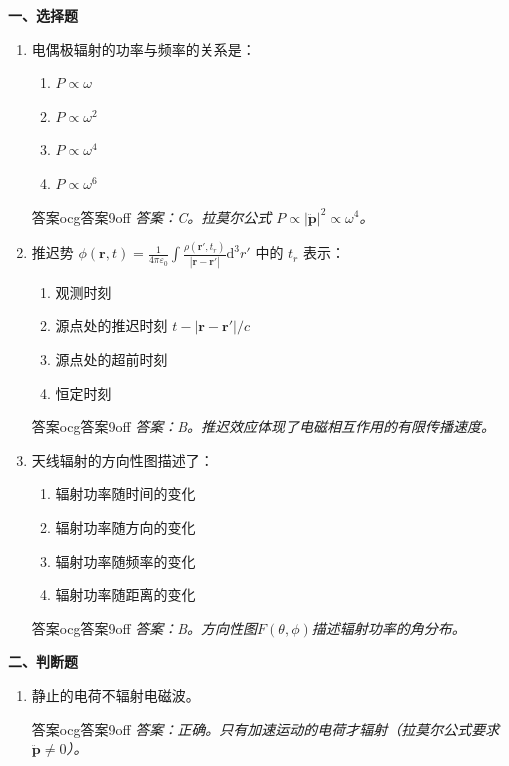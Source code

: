 \documentclass[11pt,a4paper,openany,oneside]{book}
\newcommand{\diff}{\mathrm{d}}
\newcommand{\eps}{\varepsilon}
\newcommand{\vect}[1]{\bm{#1}}
\begin{document}
\begin{miniquiz}
\textbf{一、选择题}
\begin{enumerate}[label=\arabic*.]
\item 电偶极辐射的功率与频率的关系是：
  \begin{enumerate}[label=(\Alph*),nosep]
  \item $P \propto \omega$
  \item $P \propto \omega^2$
  \item $P \propto \omega^4$
  \item $P \propto \omega^6$
  \end{enumerate}
\begin{ocg}{答案}{ocg答案9}{off}
  \textit{答案：C。拉莫尔公式 $P \propto |\ddot{\vect{p}}|^2 \propto \omega^4$。}
\end{ocg}

\item 推迟势 $\phi(\vect{r},t) = \frac{1}{4\pi\eps_0}\int \frac{\rho(\vect{r}',t_r)}{|\vect{r}-\vect{r}'|}\diff^3r'$ 中的 $t_r$ 表示：
  \begin{enumerate}[label=(\Alph*),nosep]
  \item 观测时刻
  \item 源点处的推迟时刻 $t - |\vect{r}-\vect{r}'|/c$
  \item 源点处的超前时刻
  \item 恒定时刻
  \end{enumerate}
\begin{ocg}{答案}{ocg答案9}{off}
  \textit{答案：B。推迟效应体现了电磁相互作用的有限传播速度。}
\end{ocg}

\item 天线辐射的方向性图描述了：
  \begin{enumerate}[label=(\Alph*),nosep]
  \item 辐射功率随时间的变化
  \item 辐射功率随方向的变化
  \item 辐射功率随频率的变化
  \item 辐射功率随距离的变化
  \end{enumerate}
\begin{ocg}{答案}{ocg答案9}{off}
  \textit{答案：B。方向性图$F(\theta,\phi)$描述辐射功率的角分布。}
\end{ocg}
\end{enumerate}

\vspace{0.5em}
\textbf{二、判断题}
\begin{enumerate}[label=\arabic*.,resume]
\item 静止的电荷不辐射电磁波。
\begin{ocg}{答案}{ocg答案9}{off}
  \textit{答案：正确。只有加速运动的电荷才辐射（拉莫尔公式要求$\ddot{\vect{p}}\neq 0$）。}
\end{ocg}


\end{enumerate}
\end{miniquiz}
\end{document}
